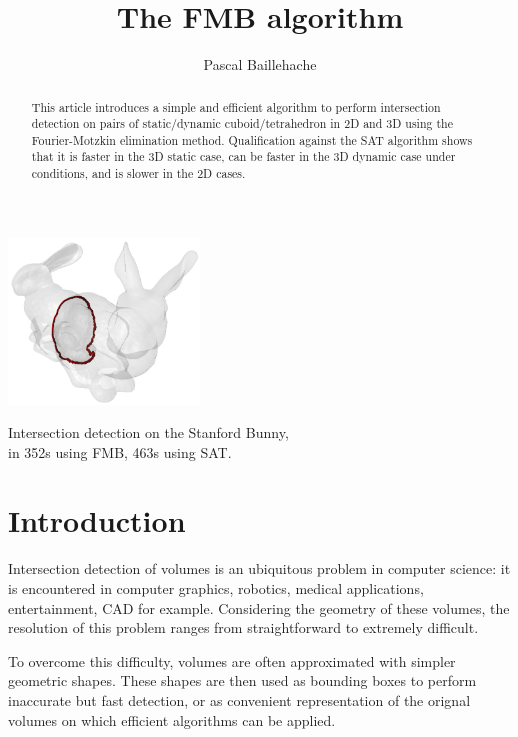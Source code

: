 \documentclass[12pt, a4paper]{article}
\begin{document}
\title{The FMB algorithm}

\author{Pascal Baillehache}

\maketitle

\begin{center}
\includegraphics[width=2in]{bunny.png}\\
\label{fig:teaser}
\caption{Intersection detection on the Stanford Bunny,\\in 352s using FMB, 463s using SAT.}
\end{center}

\begin{abstract}
\small
This article introduces a simple and efficient algorithm to perform intersection detection on pairs of static/dynamic cuboid/tetrahedron in 2D and 3D using the Fourier-Motzkin elimination method. Qualification against the SAT algorithm shows that it is faster in the 3D static case, can be faster in the 3D dynamic case under conditions, and is slower in the 2D cases.
\end{abstract}

\section{Introduction}
\label{sec:introduction}

Intersection detection of volumes is an ubiquitous problem in computer science: it is encountered in computer graphics, robotics, medical applications, entertainment, CAD for example. Considering the geometry of these volumes, the resolution of this problem ranges from straightforward to extremely difficult.

To overcome this difficulty, volumes are often approximated with simpler geometric shapes. These shapes are then used as bounding boxes to perform inaccurate but fast  detection, or as convenient representation of the orignal volumes on which efficient algorithms can be applied.
\end{document}
